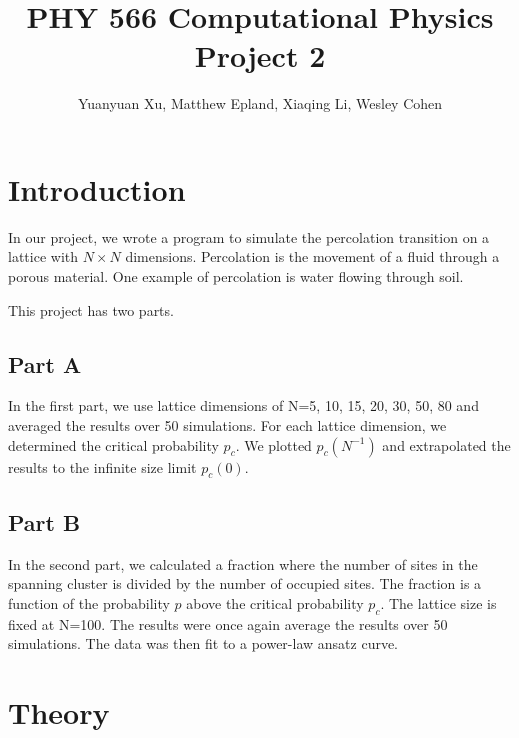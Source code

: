 \documentclass[12pt]{article}
\begin{document}
	
\title{PHY 566 Computational Physics Project 2}
\author{Yuanyuan Xu, Matthew Epland, Xiaqing Li, Wesley Cohen}
\maketitle

\section{Introduction}
\indent \indent In our project, we wrote a program to simulate the percolation transition on a lattice with $N \times N$ dimensions. Percolation is the movement of a fluid through a porous material. One example of percolation is water flowing through soil.  

This project has two parts.

\subsection{Part A}
\indent \indent In the first part, we use lattice dimensions of N=5, 10, 15, 20, 30, 50, 80 and averaged the results over 50 simulations. For each lattice dimension, we determined the critical probability $p_c$. We plotted $p_c(N^{-1})$ and extrapolated the results to the infinite size limit $p_c(0)$.

\subsection{Part B}
\indent \indent In the second part, we calculated a fraction where the number of sites in the spanning cluster is divided by the number of occupied sites. The fraction is a function of the probability $p$ above the critical probability $p_c$. The lattice size is fixed at N=100. The results were once again average the results over 50 simulations. The data was then fit to a power-law ansatz curve.

\section{Theory}
\end{document}
